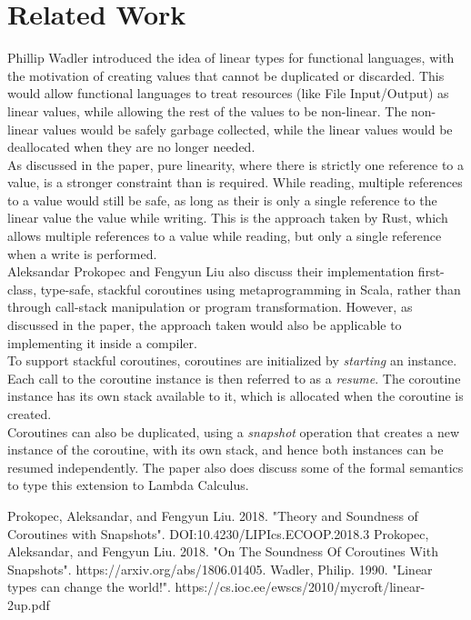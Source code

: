 \documentclass[publish, nobox]{acmconf}
\begin{document}
\section*{Related Work}
Phillip Wadler \cite{wadler} introduced the idea of linear types for functional languages, with the motivation of creating values that cannot be duplicated or discarded. This would allow functional languages to treat resources (like File Input/Output) as linear values, while allowing the rest of the values to be non-linear. The non-linear values would be safely garbage collected, while the linear values would be deallocated when they are no longer needed. \\ 
As discussed in the paper, pure linearity, where there is strictly one reference to a value, is a stronger constraint than is required. While reading, multiple references to a value would still be safe, as long as their is only a single reference to the linear value the value while writing. This is the approach taken by Rust, which allows multiple references to a value while reading, but only a single reference when a write is performed. \\
Aleksandar Prokopec and Fengyun Liu \cite{soundnes} also discuss their implementation first-class, type-safe, stackful coroutines using metaprogramming in Scala, rather than through call-stack manipulation or program transformation. However, as discussed in the paper, the approach taken would also be applicable to implementing it inside a compiler. \\
To support stackful coroutines, coroutines are initialized by \textit{starting} an instance. Each call to the coroutine instance is then referred to as a \textit{resume}. The coroutine instance has its own stack available to it, which is allocated when the coroutine is created. \\
Coroutines can also be duplicated, using a \textit{snapshot} operation that creates a new instance of the coroutine, with its own stack, and hence both instances can be resumed independently. The paper also does discuss some of the formal semantics to type this extension to Lambda Calculus.
\vfill\null
\begin{thebibliography}{9}
Prokopec, Aleksandar, and Fengyun Liu. 2018. "Theory and Soundness of Coroutines with Snapshots". DOI:10.4230/LIPIcs.ECOOP.2018.3
Prokopec, Aleksandar, and Fengyun Liu. 2018. "On The Soundness Of Coroutines With Snapshots". https://arxiv.org/abs/1806.01405.
Wadler, Philip. 1990. "Linear types can change the world!". https://cs.ioc.ee/ewscs/2010/mycroft/linear-2up.pdf
\end{thebibliography}
\end{document}
